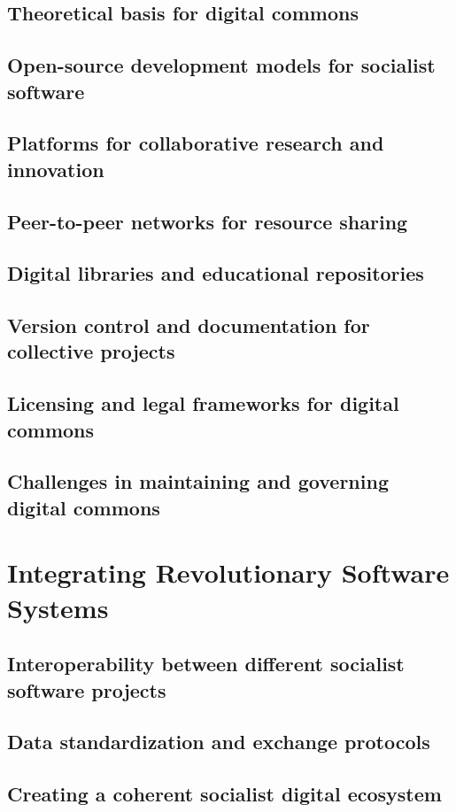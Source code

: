 \subsection{Theoretical basis for digital commons}
\subsection{Open-source development models for socialist software}
\subsection{Platforms for collaborative research and innovation}
\subsection{Peer-to-peer networks for resource sharing}
\subsection{Digital libraries and educational repositories}
\subsection{Version control and documentation for collective projects}
\subsection{Licensing and legal frameworks for digital commons}
\subsection{Challenges in maintaining and governing digital commons}

\newpage

\section{Integrating Revolutionary Software Systems}
\subsection{Interoperability between different socialist software projects}
\subsection{Data standardization and exchange protocols}
\subsection{Creating a coherent socialist digital ecosystem}
